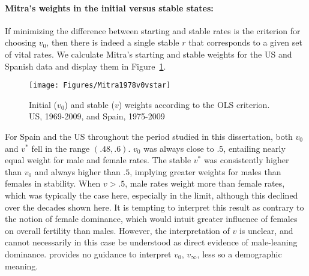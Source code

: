 \paragraph{Mitra's weights in the initial versus stable states: } If minimizing
the difference between starting and stable rates is the criterion for choosing $v_0$, 
then there is indeed a single stable $r$ that
corresponds to a given set of vital rates. We calculate Mitra's starting and
stable weights for the US and Spanish data and display them
in Figure~\ref{fig:Mitra1978v0vstar}.

\begin{figure}[ht!]
        \centering  
          \caption{Initial ($v_0$) and stable ($v$) weights according to the OLS
          criterion. US, 1969-2009, and Spain, 1975-2009 
          \citet{mitra1978derivation}}
           \quad
           \texttt{[image: Figures/Mitra1978v0vstar]}
          \label{fig:Mitra1978v0vstar}
\end{figure}

For Spain and the US throughout the period studied in this dissertation, both
$v_0$ and $v^\ast$ fell in the range $(.48,.6)$. $v_0$ was always
close to $.5$, entailing nearly equal weight for male and female rates.
The stable $v^\ast$ was consistently higher than $v_0$ and always higher than
$.5$, implying greater weights for males than females in stability. When $v > .5$, male rates weight
more than female rates, which was typically the case here, especially in the
limit, although this declined over the decades shown here. It is
tempting to interpret this result as contrary to the notion of female dominance,
which would intuit greater influence of females on overall fertility than
males. However, the interpretation of $v$ is unclear, and cannot necessarily in
this case be understood as direct evidence of male-leaning dominance.
\citet{mitra1978derivation} provides no guidance to interpret $v_0$, $v_\infty$,
less so a demographic meaning. 

